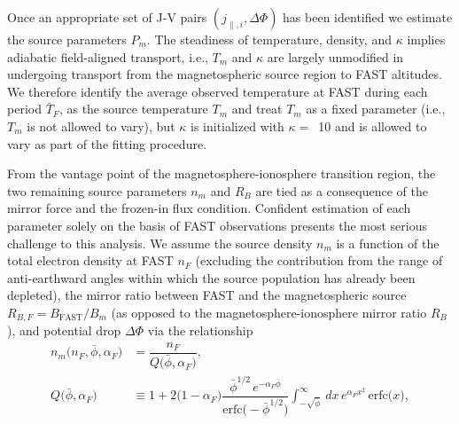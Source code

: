   Once an appropriate set of J-V pairs $( j_{\parallel,i} , \Delta \Phi )$ has
  been identified we estimate the source parameters $P_m$. The steadiness of
  temperature, density, and $\kappa$ implies adiabatic field-aligned transport,
  i.e., $T_m$ and $\kappa$ are largely unmodified in undergoing transport from
  the magnetospheric source region to FAST altitudes. We therefore identify the
  average observed temperature at FAST during each period $\bar{T}_F$, as the
  source temperature $T_m$ and treat $T_m$ as a fixed parameter (i.e., $T_m$ is
  not allowed to vary), but $\kappa$ is initialized with $\kappa =$~10 and is
  allowed to vary as part of the fitting procedure.

  From the vantage point of the magnetosphere-ionosphere transition region, the
  two remaining source parameters $n_m$ and $R_B$ are tied as a consequence of
  the mirror force and the frozen-in flux condition. Confident estimation of
  each parameter solely on the basis of FAST observations presents the most
  serious challenge to this analysis. We assume the source density $n_m$ is a
  function of the total electron density at FAST $n_F$ (excluding the
  contribution from the range of anti-earthward angles within which the source
  population has already been depleted), the mirror ratio between FAST and the
  magnetospheric source $R_{B,F} = B_\textrm{FAST} / B_m$ (as opposed to the
  magnetosphere-ionosphere mirror ratio $R_B$), and potential drop $\Delta \Phi$
  via the relationship \citep{Barbosa1977}
  \begin{subequations}
    \begin{align} n_m \big ( n_F, \bar{\phi}, \alpha_F \big ) &= \dfrac{n_F}{Q \big ( \bar{\phi}, \alpha_F \big ) }, \\
      Q \big ( \bar{\phi}, \alpha_F \big ) &\equiv 1 + 2 \big ( 1 - \alpha_F
                                             \big ) \dfrac{ \bar{\phi}^{1/2} \,
                                             e^{- \alpha_F \bar{\phi}}
                                             }{\textrm{erfc} \big ( -
                                             \bar{\phi}^{1/2} \big )} {
                                             \displaystyle
                                             \int_{-\sqrt{\bar{\phi}}}^{\infty}
                                             } \, dx \, e^{\alpha_F x^2} \,
                                             \textrm{erfc} \big ( x \big
                                             ), \label{ch6:eqBarbosa}
    \end{align}
  \end{subequations}
